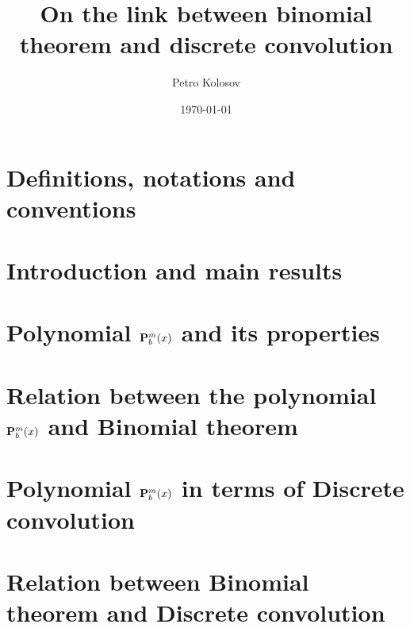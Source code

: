 \documentclass[12pt,letterpaper,oneside,reqno]{amsart}
\title[On the link between binomial theorem and discrete convolution]
{On the link between binomial theorem and discrete convolution}
\author[Petro Kolosov]{Petro Kolosov}
\date{\today}
\newcommand \polynomialP [4][P]{{\mathbf{#1}}\sp{#2} \sb{#3}(#4)}
\numberwithin{equation}{section}
\begin{document}
    \begin{abstract}
        
    \end{abstract}
    \maketitle
    \tableofcontents


    \section{Definitions, notations and conventions} \label{sec:definitions-notations-and-conventions}
    
    \clearpage


    \section{Introduction and main results} \label{sec:introduction}
    


    \section{Polynomial \texorpdfstring{$\polynomialP{m}{b}{x}$}{P[m,b,x]} and its properties}
    \label{sec:polynomial-p-and-its-properties}
    


    \section{Relation between the polynomial \texorpdfstring{$\polynomialP{m}{b}{x}$}{P[m,b,x]} and Binomial theorem}
    \label{sec:odd-binomial-expansion-as-partial-case-of-polynomial-p}
    


    \section{Polynomial \texorpdfstring{$\polynomialP{m}{b}{x}$}{P[m,b,x]} in terms of Discrete convolution}
    \label{sec:relation-between-p-and-convolution-of-polynomials}
    


    \section{Relation between Binomial theorem and Discrete convolution}
    \label{sec:relation-between-binomial-theorem-and-discrete-convolution}
    
\end{document}
